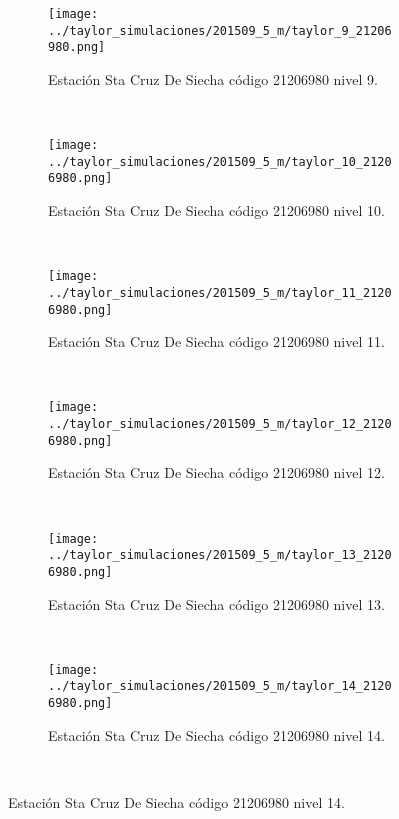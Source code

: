 \begin{figure}[H]\ContinuedFloat
\centering
\begin{subfigure}[normla]{0.4\textwidth}
\caption{Estación Sta Cruz De Siecha  código 21206980 nivel 9.}
\texttt{[image: ../taylor\_simulaciones/201509\_5\_m/taylor\_9\_21206980.png]}
\end{subfigure}
~
\begin{subfigure}[normla]{0.4\textwidth}
\caption{Estación Sta Cruz De Siecha  código 21206980 nivel 10.}
\texttt{[image: ../taylor\_simulaciones/201509\_5\_m/taylor\_10\_21206980.png]}
\end{subfigure}
~
\begin{subfigure}[normla]{0.4\textwidth}
\caption{Estación Sta Cruz De Siecha  código 21206980 nivel 11.}
\texttt{[image: ../taylor\_simulaciones/201509\_5\_m/taylor\_11\_21206980.png]}
\end{subfigure}
~
\begin{subfigure}[normla]{0.4\textwidth}
\caption{Estación Sta Cruz De Siecha  código 21206980 nivel 12.}
\texttt{[image: ../taylor\_simulaciones/201509\_5\_m/taylor\_12\_21206980.png]}
\end{subfigure}
~
\begin{subfigure}[normla]{0.4\textwidth}
\caption{Estación Sta Cruz De Siecha  código 21206980 nivel 13.}
\texttt{[image: ../taylor\_simulaciones/201509\_5\_m/taylor\_13\_21206980.png]}
\end{subfigure}
~
\begin{subfigure}[normla]{0.4\textwidth}
\caption{Estación Sta Cruz De Siecha  código 21206980 nivel 14.}
\texttt{[image: ../taylor\_simulaciones/201509\_5\_m/taylor\_14\_21206980.png]}
\end{subfigure}
~
\end{figure}
           

